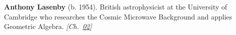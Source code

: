 \textbf{Anthony Lasenby} (b. 1954). British astrophysicist at the University of Cambridge who researches the Cosmic Microwave Background and applies Geometric Algebra. \emph{[Ch.~\hyperref[ch:acceleratinguniverse]{02}]}

